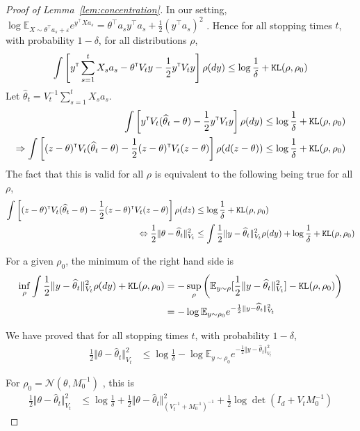 \begin{proof}[Proof of Lemma~\ref{lem:concentration}]
In our setting, $\log \mathbb{E}_{X\sim \theta^\top a_s+\varepsilon}e^{y^\top X a_s} = \theta^\top a_s y^\top a_s+\frac{1}{2} (y^\top a_s)^2$ . Hence for all stopping times $t$, with probability $1- \delta$, for all distributions $\rho$,
\begin{align*}
\int \left[y^{\mathsf{\scriptscriptstyle T}} \sum_{s=1}^t X_s a_s - \theta^{\mathsf{\scriptscriptstyle T}} V_t y -\frac{1}{2} y^{\mathsf{\scriptscriptstyle T}} V_t y \right] \rho(dy)
\le \log\frac{1}{\delta} + \texttt{KL}(\rho,\rho_0)
\end{align*}
Let $\hat{\theta}_t = V_t^{-1}\sum_{s=1}^t X_s a_s$.
\begin{align*}
\int \left[y^{\mathsf{\scriptscriptstyle T}} V_t (\widehat{\theta}_t - \theta) - \frac{1}{2} y^{\mathsf{\scriptscriptstyle T}} V_t y \right] \rho(dy)
&\le \log\frac{1}{\delta} + \texttt{KL}(\rho,\rho_0)
\\
\Rightarrow \int \left[(z - \theta)^{\mathsf{\scriptscriptstyle T}} V_t (\widehat{\theta}_t - \theta) - \frac{1}{2} (z - \theta)^{\mathsf{\scriptscriptstyle T}} V_t (z - \theta) \right] \rho(d(z - \theta))
&\le \log\frac{1}{\delta} + \texttt{KL}(\rho,\rho_0)
\end{align*}
The fact that this is valid for all $\rho$ is equivalent to the following being true for all $\rho$,
\begin{align*}
\int \left[(z - \theta)^{\mathsf{\scriptscriptstyle T}} V_t (\widehat{\theta}_t - \theta) - \frac{1}{2} (z - \theta)^{\mathsf{\scriptscriptstyle T}} V_t (z - \theta) \right] \rho(dz)
&\le \log\frac{1}{\delta} + \texttt{KL}(\rho,\rho_0)
\\
\Leftrightarrow
\frac{1}{2} \Vert \theta - \widehat{\theta}_t \Vert^2_{V_t}
&\le \int  \frac{1}{2} \Vert y - \widehat{\theta}_t \Vert_{V_t}^2  \rho(dy)  + \log\frac{1}{\delta} + \texttt{KL}(\rho,\rho_0)
\end{align*}

For a given $\rho_0$, the minimum of the right hand side is
\begin{align*}
\inf_\rho \int \frac{1}{2} \Vert y - \widehat{\theta}_t \Vert_{V_t}^2  \rho(dy) + \texttt{KL}(\rho,\rho_0)
&= - \sup_\rho \left(\mathbb{E}_{y\sim\rho}[\frac{1}{2} \Vert y - \widehat{\theta}_t \Vert_{V_t}^2] - \texttt{KL}(\rho, \rho_0)\right)
\\
&= - \log \mathbb{E}_{y \sim \rho_0} e^{- \frac{1}{2} \Vert y - \widehat{\theta}_t \Vert_{V_t}^2}
\end{align*}

We have proved that for all stopping times $t$, with probability $1- \delta$,
\begin{align*}
\frac{1}{2} \Vert \theta - \hat{\theta}_t \Vert^2_{V_t}
&\le \log\frac{1}{\delta} - \log \mathbb{E}_{y \sim \rho_0} e^{- \frac{1}{2} \Vert y - \hat{\theta}_t \Vert_{V_t}^2}
\end{align*}

For $\rho_0 = \mathcal N(\theta, M_0^{-1})$ , this is
\begin{align*}
\frac{1}{2} \Vert \theta - \hat{\theta}_t \Vert^2_{V_t}
&\le \log\frac{1}{\delta} + \frac{1}{2} \Vert \theta - \hat{\theta}_t \Vert_{(V_t^{-1} + M_0^{-1})^{-1}}^2 + \frac{1}{2} \log \det (I_d + V_t M_0^{-1})
\end{align*}

\end{proof}


